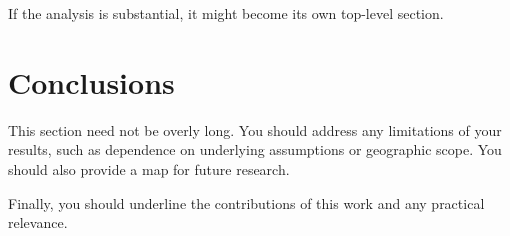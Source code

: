 \documentclass[3p, authoryear]{elsarticle} %
\begin{document}
If the analysis is substantial, it might become its own top-level section.

\hypertarget{conclusions}{%
\section{Conclusions}\label{conclusions}}

This section need not be overly long. You should address any limitations of your
results, such as dependence on underlying assumptions or geographic scope.
You should also provide a map for future research.

Finally, you should underline the contributions of this work and any practical
relevance.


\end{document}
